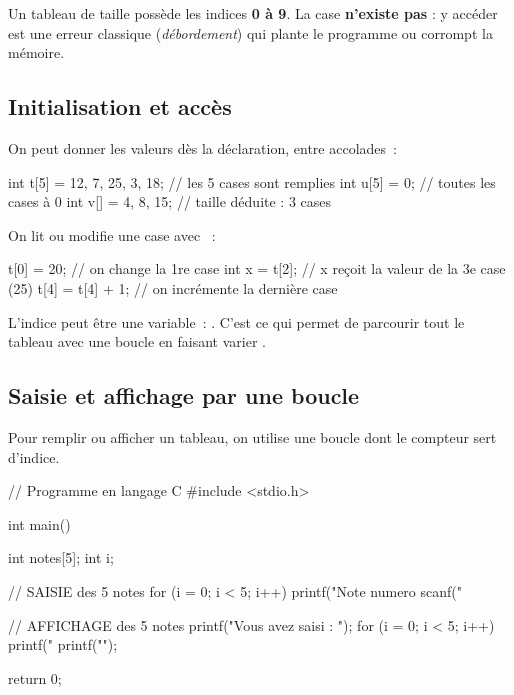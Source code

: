 \begin{attention}
Un tableau de taille  possède les indices \textbf{0 à 9}. La case
 \textbf{n'existe pas} : y accéder est une erreur classique
(\emph{débordement}) qui plante le programme ou corrompt la mémoire.
\end{attention}

\subsection{Initialisation et accès}

On peut donner les valeurs dès la déclaration, entre accolades~:

\begin{codec}
int t[5] = {12, 7, 25, 3, 18};   // les 5 cases sont remplies
int u[5] = {0};                  // toutes les cases à 0
int v[] = {4, 8, 15};            // taille déduite : 3 cases
\end{codec}

On lit ou modifie une case avec ~:

\begin{codec}
t[0] = 20;              // on change la 1re case
int x = t[2];           // x reçoit la valeur de la 3e case (25)
t[4] = t[4] + 1;        // on incrémente la dernière case
\end{codec}

\begin{remarque}
L'indice peut être une variable~: . C'est ce qui permet de parcourir
tout le tableau avec une boucle  en faisant varier .
\end{remarque}

\subsection{Saisie et affichage par une boucle}

Pour remplir ou afficher un tableau, on utilise une boucle  dont le
compteur sert d'indice.

\begin{codec}
// Programme en langage C
#include <stdio.h>

int main() {
    int notes[5];
    int i;

    // SAISIE des 5 notes
    for (i = 0; i < 5; i++) {
        printf("Note numero %
        scanf("%
    }

    // AFFICHAGE des 5 notes
    printf("Vous avez saisi : ");
    for (i = 0; i < 5; i++) {
        printf("%
    }
    printf("\n");

    return 0;
}
\end{codec}


